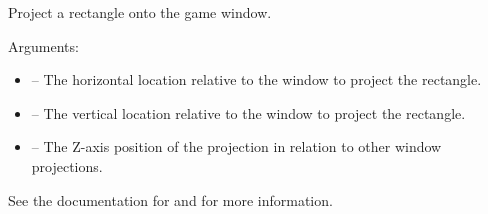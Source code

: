 \documentclass[letterpaper,10pt,english]{sphinxmanual}
\begin{document}
\begin{fulllineitems}
\label{dsp:sge.dsp.Game.project_rectangle}
Project a rectangle onto the game window.

Arguments:
\begin{itemize}
\item {} 
 -- The horizontal location relative to the window to
project the rectangle.

\item {} 
 -- The vertical location relative to the window to
project the rectangle.

\item {} 
 -- The Z-axis position of the projection in relation to
other window projections.

\end{itemize}

See the documentation for {\hyperref[gfx:sge.gfx.Sprite.draw_rectangle]{\emph{}}}
and {\hyperref[dsp:sge.dsp.Game.project_dot]{\emph{}}} for more information.

\end{fulllineitems}

\end{document}

